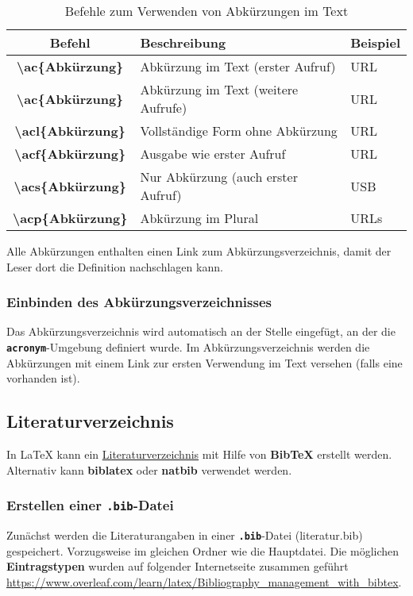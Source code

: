 \begin{table}[H]
  \centering
  \begin{tabular}{>{\bfseries}cll}
    \toprule
    \textbf{Befehl}                 & \textbf{Beschreibung}               & \textbf{Beispiel} \\
    \midrule
    \textbackslash ac\{Abkürzung\}  & Abkürzung im Text (erster Aufruf)   & \ac{URL}          \\
    \textbackslash ac\{Abkürzung\}  & Abkürzung im Text (weitere Aufrufe) & \ac{URL}          \\
    \textbackslash acl\{Abkürzung\} & Vollständige Form ohne Abkürzung    & \acl{URL}         \\
    \textbackslash acf\{Abkürzung\} & Ausgabe wie erster Aufruf           & \acf{URL}         \\
    \textbackslash acs\{Abkürzung\} & Nur Abkürzung (auch erster Aufruf)  & \acs{USB}         \\
    \textbackslash acp\{Abkürzung\} & Abkürzung im Plural                 & \acp{URL}         \\
    \bottomrule
  \end{tabular}
  \caption{Befehle zum Verwenden von Abkürzungen im Text}
  \label{tab:acronyms_usage}
\end{table}

Alle Abkürzungen enthalten einen Link zum Abkürzungsverzeichnis, damit der Leser dort die Definition nachschlagen kann.

\subsubsection{Einbinden des Abkürzungsverzeichnisses}
Das Abkürzungsverzeichnis wird automatisch an der Stelle eingefügt, an der die \texttt{\textbf{acronym}}-Umgebung definiert wurde. Im Abkürzungsverzeichnis werden die Abkürzungen mit einem Link zur ersten Verwendung im Text versehen (falls eine vorhanden ist).


\subsection{Literaturverzeichnis}
\label{sec:literaturverzeichnis_erklärung}
In \LaTeX{} kann ein \hyperref[sec:literaturverzeichnis]{Literaturverzeichnis} mit Hilfe von \textbf{BibTeX} erstellt werden.
Alternativ kann \textbf{biblatex} oder \textbf{natbib} verwendet werden.

\subsubsection{Erstellen einer \textbf{\texttt{.bib}}-Datei}
Zunächst werden die Literaturangaben in einer \textbf{\texttt{.bib}}-Datei (literatur.bib) gespeichert. Vorzugsweise im gleichen Ordner wie die Hauptdatei.
Die möglichen \textbf{Eintragstypen} wurden auf folgender Internetseite zusammen geführt \href{https://www.overleaf.com/learn/latex/Bibliography_management_with_bibtex#Taking_another_look_at_.bib_files}{https://www.overleaf.com/learn/latex/Bibliography\_management\_with\_bibtex}.

